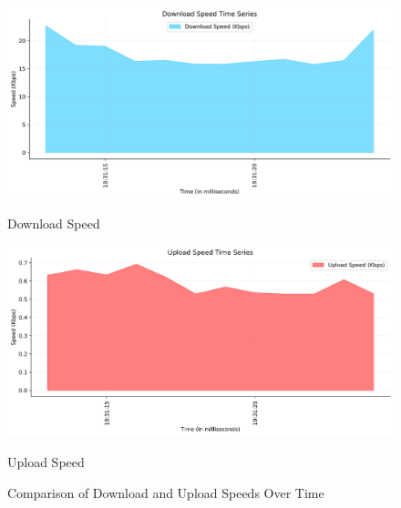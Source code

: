 \documentclass{article}
\begin{document}
\begin{figure}[H]
    \centering
    \begin{minipage}{0.45\textwidth}
        \centering
        \includegraphics[width=\textwidth]{time_series_download.png}
        \caption{Download Speed}
        \label{fig:download_speed}
    \end{minipage}
    \hfill
    \begin{minipage}{0.45\textwidth}
        \centering
        \includegraphics[width=\textwidth]{time_series_upload.png}
        \caption{Upload Speed}
        \label{fig:upload_speed}
    \end{minipage}
    \caption{Comparison of Download and Upload Speeds Over Time}
    \label{fig:speed_comparison}
\end{figure}
\end{document}
